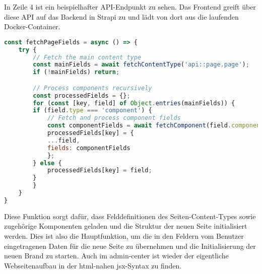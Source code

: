 In Zeile 4 ist ein beispielhafter API-Endpunkt zu sehen. Das Frontend greift über diese API auf das Backend in Strapi zu und lädt von dort aus die laufenden Docker-Container. 

\begin{lstlisting}[language=JavaScript, caption={fetchPageFields-Funktion}, label={lst:admincenterjsxFetchPageFieldsFunktion}]
const fetchPageFields = async () => {
    try {
        // Fetch the main content type
        const mainFields = await fetchContentType('api::page.page');
        if (!mainFields) return;

        // Process components recursively
        const processedFields = {};
        for (const [key, field] of Object.entries(mainFields)) {
        if (field.type === 'component') {
            // Fetch and process component fields
            const componentFields = await fetchComponent(field.component);
            processedFields[key] = {
            ...field,
            fields: componentFields
            };
        } else {
            processedFields[key] = field;
        }
        }
    }
}
\end{lstlisting}

Diese Funktion sorgt dafür, dass Felddefinitionen des Seiten-Content-Types sowie zugehörige Komponenten geladen und die Struktur der neuen Seite initialisiert werden. Dies ist also die Hauptfunktion, um die in den Feldern vom Benutzer eingetragenen Daten für die neue Seite zu übernehmen und die Initialisierung der neuen Brand zu starten.
Auch im admin-center ist wieder der eigentliche Webseitenaufbau in der html-nahen jsx-Syntax zu finden.

